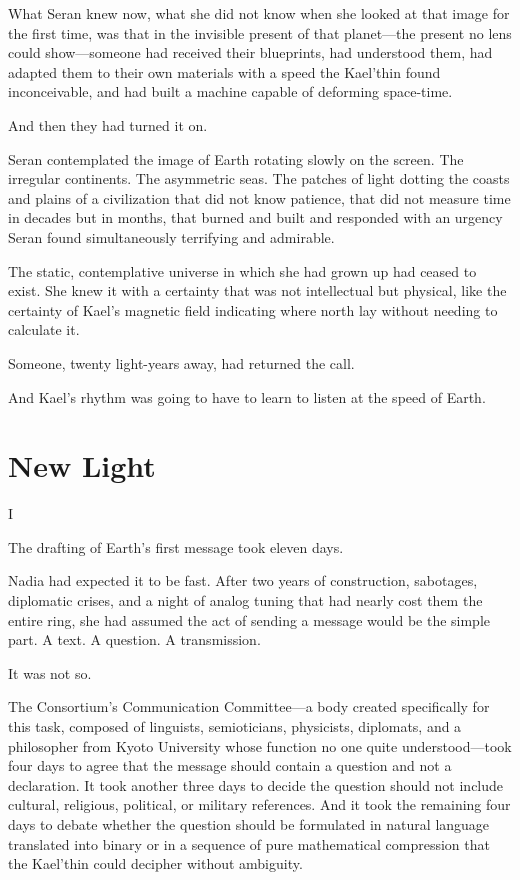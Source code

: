 \documentclass[11pt,a5paper,twoside]{book}
\begin{document}
What Seran knew now, what she did not know when she looked at that image for the first time, was that in the invisible present of that planet—the present no lens could show—someone had received their blueprints, had understood them, had adapted them to their own materials with a speed the Kael'thin found inconceivable, and had built a machine capable of deforming space-time.

And then they had turned it on.

Seran contemplated the image of Earth rotating slowly on the screen. The irregular continents. The asymmetric seas. The patches of light dotting the coasts and plains of a civilization that did not know patience, that did not measure time in decades but in months, that burned and built and responded with an urgency Seran found simultaneously terrifying and admirable.

The static, contemplative universe in which she had grown up had ceased to exist. She knew it with a certainty that was not intellectual but physical, like the certainty of Kael's magnetic field indicating where north lay without needing to calculate it.

Someone, twenty light-years away, had returned the call.

And Kael's rhythm was going to have to learn to listen at the speed of Earth.

\chapter{New Light}

I

The drafting of Earth's first message took eleven days.

Nadia had expected it to be fast. After two years of construction, sabotages, diplomatic crises, and a night of analog tuning that had nearly cost them the entire ring, she had assumed the act of sending a message would be the simple part. A text. A question. A transmission.

It was not so.

The Consortium's Communication Committee—a body created specifically for this task, composed of linguists, semioticians, physicists, diplomats, and a philosopher from Kyoto University whose function no one quite understood—took four days to agree that the message should contain a question and not a declaration. It took another three days to decide the question should not include cultural, religious, political, or military references. And it took the remaining four days to debate whether the question should be formulated in natural language translated into binary or in a sequence of pure mathematical compression that the Kael'thin could decipher without ambiguity.
\end{document}
